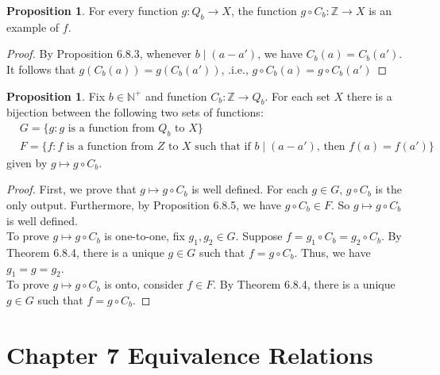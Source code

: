 \documentclass[14pt]{article}
\theoremstyle{definition}
\newtheorem{proposition}[definition]{Proposition}
\begin{document}
  \vspace{2mm}
  
  \begin{proposition}
      For every function $g\colon Q_b\rightarrow X $, the function $g\circ C_b\colon \mathbb{Z}\rightarrow X$ is an example of $f$. 
  \end{proposition}
  \begin{proof}
      By Proposition 6.8.3, whenever $b\mid (a-a')$, we have $C_b(a)=C_b(a')$. It follows that $g(C_b(a))=g(C_b(a'))$, .i.e., $g\circ C_b (a)=g\circ C_b (a')$
  \end{proof}
  
  \vspace{2mm}
  
  \begin{proposition}
          Fix $b\in \mathbb{N}^+$ and function $C_b\colon \mathbb{Z}\rightarrow Q_b$. For each set $X$ there is a bijection between the following two sets of functions:
      \begin{equation*}
          \begin{split}
              &G=\{g\colon g \text{ is a function from } Q_b \text{ to } X\}\\
              &F=\{f\colon f \text{ is a function from } Z \text{ to } X \text{ such that if } b\mid (a-a') \text{, then } f(a)=f(a') \}
          \end{split}
      \end{equation*}
      given by $g\mapsto g\circ C_b$.
  \end{proposition}
  
  \begin{proof}
      First, we prove that $g\mapsto g\circ C_b$ is well defined. For each $g \in G$, $g\circ C_b$ is the only output. Furthermore, by Proposition 6.8.5, we have $g\circ C_b\in F$. So  $g\mapsto g\circ C_b$ is well defined.\\
      To prove $g\mapsto g\circ C_b$ is one-to-one, fix $g_1, g_2 \in G$. Suppose $f=g_1\circ C_b=g_2\circ C_b$. By Theorem 6.8.4, there is a unique $g \in G$ such that $f=g\circ C_b$. Thus, we have $g_1=g=g_2$.\\
      To prove $g\mapsto g\circ C_b$ is onto, consider $f \in F$. By Theorem 6.8.4, there is a unique $g\in G$ such that $f=g\circ C_b$.
      
 \end{proof}

 \newpage
  
\section{Chapter 7 Equivalence Relations}
\end{document}
